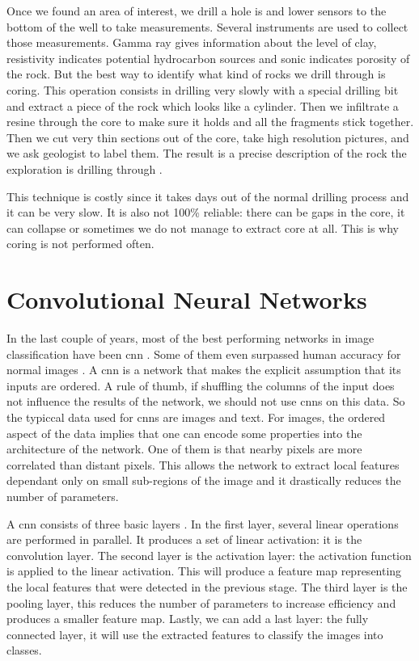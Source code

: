 Once we found an area of interest, we drill a hole is and lower sensors  to the bottom of the well to take measurements. Several instruments are used to collect those measurements.  Gamma ray gives information about the level of clay, resistivity indicates potential hydrocarbon sources and sonic indicates porosity of the rock. But the best way to identify what kind of rocks we drill through is coring. This operation consists in drilling very slowly with a special drilling bit and extract a piece of the rock which looks like a cylinder. Then we infiltrate a resine through the core to make sure it holds and all the fragments stick together. Then we cut very thin sections out of the core, take high resolution pictures, and we ask geologist to label them. The result is a precise description of the rock the exploration is drilling through \cite{oilbegin}.  

This technique is costly since it takes days out of the normal drilling process and it can be very slow. It is also not 100\% reliable: there can be gaps in the core, it can collapse or sometimes we do not manage to extract core at all. This is why coring is not performed often. 

\section{Convolutional Neural Networks}
In the last couple of years, most of the best performing networks in image classification have been \gls{cnn} \cite{resnetpaper, alexpaper, googlepaper}. Some of them even surpassed human accuracy for normal images \cite{humanDNN}.
A \gls{cnn} is a network that makes the explicit assumption that its inputs are ordered. A rule of thumb, if shuffling the columns of the input does not influence the results of the network, we should not use \gls{cnn}s on this data. So the typiccal data used for \gls{cnn}s are images and text. 
For images, the ordered aspect of the data implies that one can encode some properties into the architecture of the network. One of them is that nearby pixels are more correlated than distant pixels. This allows the network to extract local features dependant only on small sub-regions of the image and it drastically reduces the number of parameters. 


A \gls{cnn} consists of three basic layers \cite{deepbook}.  In the first layer, several linear operations are performed in parallel. It produces a set of linear activation: it is the convolution layer. The second layer is the activation layer: the activation function is applied to the linear activation. This will produce a feature map representing the local features that were detected in the previous stage. The third layer is the pooling layer, this reduces the number of parameters to increase efficiency and produces a smaller feature map. Lastly, we can add a last layer: the fully connected layer, it will use the extracted features to classify the images into classes.


